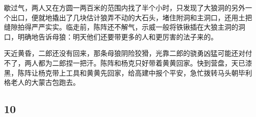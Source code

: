 \par 歇过气，两人又在方圆一两百米的范围内找了半个小时，只发现了大狼洞的另外一个出口，便就地撬出了几块估计狼弄不动的大石头，堵住附洞和主洞口，还用土把缝隙拍得严严实实。临走前，陈阵还不解气，示威一般将铁锹插在大狼主洞的洞口，明确地告诉母狼：明天他们还要带更多的人和更厉害的法子来的。
\par 天近黄昏，二郎还没有回来，那条母狼阴险狡猾，光靠二郎的骁勇凶猛可能还对付不了，两人都为二郎捏一把汗。陈阵和杨克只好带着黄黄回家。快到营盘，天已漆黑，陈阵让杨克带上工具和黄黄先回家，给高建中报个平安，急忙拨转马头朝毕利格老人的大蒙古包跑去。


\subsection*{10}

